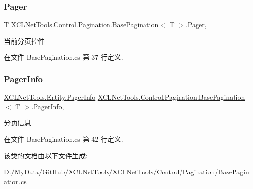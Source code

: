 \subsubsection{\texorpdfstring{Pager}{Pager}}
{\footnotesize\ttfamily T \hyperlink{class_x_c_l_net_tools_1_1_control_1_1_pagination_1_1_base_pagination}{X\+C\+L\+Net\+Tools.\+Control.\+Pagination.\+Base\+Pagination}$<$ T $>$.Pager\hspace{0.3cm}{\ttfamily [get]}, {\ttfamily [set]}}



当前分页控件 



在文件 Base\+Pagination.\+cs 第 37 行定义.

\mbox{\label{class_x_c_l_net_tools_1_1_control_1_1_pagination_1_1_base_pagination_ae27d645cd692bb7471bc6236c59496a3}} 
\subsubsection{\texorpdfstring{Pager\+Info}{PagerInfo}}
{\footnotesize\ttfamily \hyperlink{class_x_c_l_net_tools_1_1_entity_1_1_pager_info}{X\+C\+L\+Net\+Tools.\+Entity.\+Pager\+Info} \hyperlink{class_x_c_l_net_tools_1_1_control_1_1_pagination_1_1_base_pagination}{X\+C\+L\+Net\+Tools.\+Control.\+Pagination.\+Base\+Pagination}$<$ T $>$.Pager\+Info\hspace{0.3cm}{\ttfamily [get]}, {\ttfamily [set]}}



分页信息 



在文件 Base\+Pagination.\+cs 第 42 行定义.



该类的文档由以下文件生成\+:\begin{DoxyCompactItemize}
\item 
D\+:/\+My\+Data/\+Git\+Hub/\+X\+C\+L\+Net\+Tools/\+X\+C\+L\+Net\+Tools/\+Control/\+Pagination/\hyperlink{_base_pagination_8cs}{Base\+Pagination.\+cs}\end{DoxyCompactItemize}
